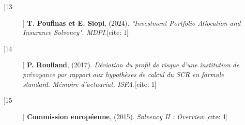 \documentclass[
]{article}
\begin{document}
\begin{description}
    \item[[13]] \textbf{T. Poufinas et E. Siopi}, (2024). \textit{"Investment Portfolio Allocation and Insurance Solvency". MDPI.}[cite: 1]
    
    \item[[14]] \textbf{P. Roulland}, (2017). \textit{Déviation du profil de risque d'une institution de prévoyance par rapport aux hypothèses de calcul du SCR en formule standard. Mémoire d'actuariat, ISFA.}[cite: 1]
    
    \item[[15]] \textbf{Commission européenne}, (2015). \textit{Solvency II : Overview.}[cite: 1]
\end{description}
\end{document}
